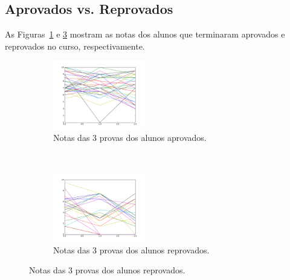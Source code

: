 \documentclass{article}
\begin{document}
\subsection*{Aprovados vs. Reprovados}

As Figuras~\ref{fig:aprovados} e \ref{fig:reprovados} mostram as notas dos alunos que terminaram aprovados e reprovados no curso, respectivamente.

\begin{center}
\begin{figure}[ht]
   \centering
   \begin{subfigure}[h]{0.45\textwidth}
      \includegraphics[width=4cm]{notasaprovados.png}
      \caption{Notas das 3 provas dos alunos aprovados.}
      \label{fig:aprovados}
   \end{subfigure}
   ~
   \begin{subfigure}[h]{0.45\textwidth}
      \includegraphics[width=4cm]{notasreprovados.png}
      \caption{Notas das 3 provas dos alunos reprovados.}
      \label{fig:reprovados}
   \end{subfigure}
\end{figure}
\end{center}
\end{document}
